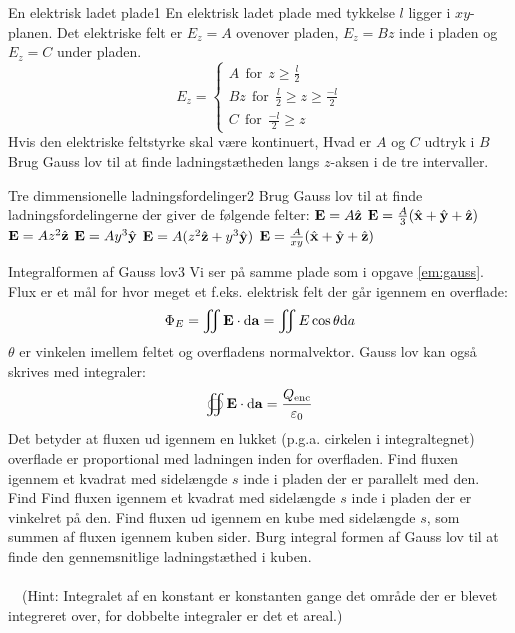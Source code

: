 \begin{opgave}{En elektrisk ladet plade}{1}
\label{em:gauss}
En elektrisk ladet plade med tykkelse $l$ ligger i $xy$-planen. Det elektriske felt er $E_z=A$ ovenover pladen, $E_z=Bz$ inde i pladen og $E_z=C$ under pladen.
$$
E_z = 
\begin{cases}
A~~\text{for}~~z\geq \frac{l}{2}\\
Bz~~\text{for}~~\frac{l}{2}\geq z\geq \frac{-l}{2}\\
C~~\text{for}~~\frac{-l}{2}\geq z
\end{cases}
$$
\opg Hvis den elektriske feltstyrke skal være kontinuert, Hvad er $A$ og $C$ udtryk i $B$
\opg Brug Gauss lov til at finde ladningstætheden langs $z$-aksen i de tre intervaller.
\end{opgave}

\begin{opgave}{Tre dimmensionelle ladningsfordelinger}{2}
Brug Gauss lov til at finde ladningsfordelingerne der giver de følgende felter:
\opg $\mathbf{E} =A\hat{\mathbf{z}}$
\opg $\mathbf{E} =\frac{A}{3}(\hat{\mathbf{x}}+\hat{\mathbf{y}}+\hat{\mathbf{z}})$
\opg $\mathbf{E} =Az^2\hat{\mathbf{z}}$
\opg $\mathbf{E} =Ay^3\hat{\mathbf{y}}$
\opg $\mathbf{E} =A(z^2\hat{\mathbf{z}}+y^3\hat{\mathbf{y}})$
\opg $\mathbf{E} =\frac{A}{xy}(\hat{\mathbf{x}}+\hat{\mathbf{y}}+\hat{\mathbf{z}})$
\end{opgave}

\begin{opgave}{Integralformen af Gauss lov}{3}
Vi ser på samme plade som i opgave \ref{em:gauss}.
Flux er et mål for hvor meget et f.eks. elektrisk felt der går igennem en overflade: $$\Phi_E = \iint \mathbf{E}\cdot\mathrm{d}\mathbf{a} = \iint E \cos \theta \mathrm{d}a$$ $\theta$ er vinkelen imellem feltet og overfladens normalvektor. Gauss lov kan også skrives med integraler:
\begin{equation}
\oiint \mathbf{E}\cdot \mathrm{d}\mathbf{a} = \frac{Q_\text{enc}}{\varepsilon_0}
\end{equation}
Det betyder at fluxen ud igennem en lukket (p.g.a. cirkelen i integraltegnet) overflade er proportional med ladningen inden for overfladen.
\opg Find fluxen igennem et kvadrat med sidelængde $s$ inde i pladen der er parallelt med den.
\opg Find Find fluxen igennem et kvadrat med sidelængde $s$ inde i pladen der er vinkelret på den.
\opg Find fluxen ud igennem en kube med sidelængde $s$, som summen af fluxen igennem kuben sider.
\opg Burg integral formen af Gauss lov til at finde den gennemsnitlige ladningstæthed i kuben.
\\\\
~~(Hint: Integralet af en konstant er konstanten gange det område der er blevet integreret over, for dobbelte integraler er det et areal.)
\end{opgave}

